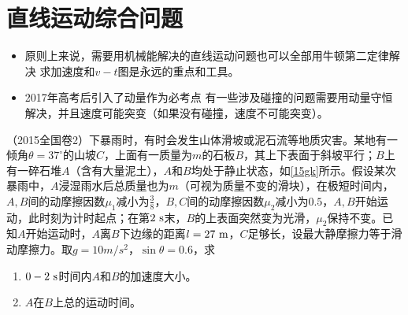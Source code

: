 \documentclass[a4paper,9pt]{ctexart}
\begin{document}
\newpage
\section{直线运动综合问题}
\begin{itemize}
\item
原则上来说，需要用机械能解决的直线运动问题也可以全部用牛顿第二定律解决 \so 求加速度和$v-t$图是永远的重点和工具。
\item
2017年高考后引入了动量作为必考点 \so 有一些涉及碰撞的问题需要用动量守恒解决，并且速度可能突变（如果没有碰撞，速度不可能突变）。
\end{itemize}
\begin{eg} \label{15w}
（2015全国卷2）下暴雨时，有时会发生山体滑坡或泥石流等地质灾害。某地有一倾角$\theta = 37^\circ$的山坡$C$，上面有一质量为$m$的石板$B$，其上下表面于斜坡平行；$B$上有一碎石堆$A$（含有大量泥土），$A$和$B$均处于静止状态，如\cref{15gk}所示。假设某次暴雨中，$A$浸湿雨水后总质量也为$m$（可视为质量不变的滑块），在极短时间内，$A,B$间的动摩擦因数$\mu_1$减小为$\frac{3}{8}$，$B,C$间的动摩擦因数$\mu_2$减小为$0.5$，$A,B$开始运动，此时刻为计时起点；在第$2{\rm \ s}$末，$B$的上表面突然变为光滑，$\mu_2$保持不变。已知$A$开始运动时，$A$离$B$下边缘的距离$l = 27{\rm \ m}$，$C$足够长，设最大静摩擦力等于滑动摩擦力。取$g = 10\unit{m/s^2}$，$\sin \theta = 0.6$，求
\begin{enumerate}
\item
$0-2{\rm \ s}$时间内$A$和$B$的加速度大小。
\item
$A$在$B$上总的运动时间。
\end{enumerate}
\end{eg}
\begin{ans}
\ 
\vspace{8cm}
\end{ans}
\end{document}
